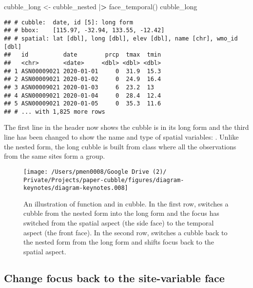 \documentclass{article}
\newenvironment{Shaded}{\begin{snugshade}}{\end{snugshade}}
\newcommand{\ErrorTok}[1]{\textcolor[rgb]{0.64,0.00,0.00}{\textbf{#1}}}
\newcommand{\FunctionTok}[1]{\textcolor[rgb]{0.00,0.00,0.00}{#1}}
\newcommand{\NormalTok}[1]{#1}
\newcommand{\OtherTok}[1]{\textcolor[rgb]{0.56,0.35,0.01}{#1}}
\newcommand{\SpecialCharTok}[1]{\textcolor[rgb]{0.00,0.00,0.00}{#1}}
\begin{document}
\begin{Shaded}
\begin{Highlighting}[]
\NormalTok{cubble\_long }\OtherTok{\textless{}{-}}\NormalTok{ cubble\_nested }\SpecialCharTok{|}\ErrorTok{\textgreater{}} \FunctionTok{face\_temporal}\NormalTok{()}
\NormalTok{cubble\_long}
\end{Highlighting}
\end{Shaded}

\begin{verbatim}
## # cubble:  date, id [5]: long form
## # bbox:    [115.97, -32.94, 133.55, -12.42]
## # spatial: lat [dbl], long [dbl], elev [dbl], name [chr], wmo_id [dbl]
##   id          date        prcp  tmax  tmin
##   <chr>       <date>     <dbl> <dbl> <dbl>
## 1 ASN00009021 2020-01-01     0  31.9  15.3
## 2 ASN00009021 2020-01-02     0  24.9  16.4
## 3 ASN00009021 2020-01-03     6  23.2  13  
## 4 ASN00009021 2020-01-04     0  28.4  12.4
## 5 ASN00009021 2020-01-05     0  35.3  11.6
## # ... with 1,825 more rows
\end{verbatim}

The first line in the header now shows the cubble is in its long form and the third line has been changed to show the name and type of spatial variables: . Unlike the nested form, the long cubble is built from class  where all the observations from the same sites form a group.

\begin{figure}

{\centering \texttt{[image: /Users/pmen0008/Google Drive (2)/ Private/Projects/paper-cubble/figures/diagram-keynotes/diagram-keynotes.008]} 

}

\caption{An illustration of function  and  in cubble. In the first row,  switches a cubble from the nested form into the long form and the focus has switched from the spatial aspect (the side face) to the temporal aspect (the front face). In the second row,  switches a cubble back to the nested form from the long form and shifts focus back to the spatial aspect.}\label{fig:face}
\end{figure}

\hypertarget{change-focus-back-to-the-site-variable-face}{%
\subsection{Change focus back to the site-variable face}\label{change-focus-back-to-the-site-variable-face}}
\end{document}
